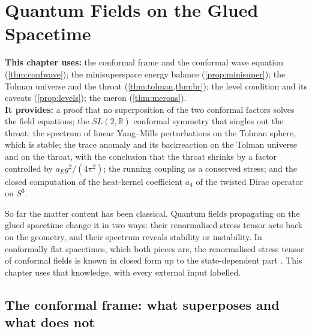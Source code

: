 \chapter{Quantum Fields on the Glued Spacetime}
\label{ch:qft}

\begin{usesbox}
\textbf{This chapter uses:} the conformal frame and the conformal wave equation (\cref{thm:confwave}); the minisuperspace energy balance (\cref{prop:minisuper}); the Tolman universe and the throat (\cref{thm:tolman,thm:br}); the level condition and its caveats (\cref{prop:levels}); the meron (\cref{thm:merons}).\\
\textbf{It provides:} a proof that no superposition of the two conformal factors solves the field equations; the $SL(2,\mathbb R)$ conformal symmetry that singles out the throat; the spectrum of linear Yang--Mills perturbations on the Tolman sphere, which is stable; the trace anomaly and its backreaction on the Tolman universe and on the throat, with the conclusion that the throat shrinks by a factor controlled by $a_Eg^2/(4\pi^2)$; the running coupling as a conserved stress; and the closed computation of the heat-kernel coefficient $a_4$ of the twisted Dirac operator on $S^3$.
\end{usesbox}

So far the matter content has been classical. Quantum fields propagating on the glued spacetime change it in two ways: their renormalised stress tensor acts back on the geometry, and their spectrum reveals stability or instability. In conformally flat spacetimes, which both pieces are, the renormalised stress tensor of conformal fields is known in closed form up to the state-dependent part \cite{BirrellDavies}. This chapter uses that knowledge, with every external input labelled.

\section{The conformal frame: what superposes and what does not}

